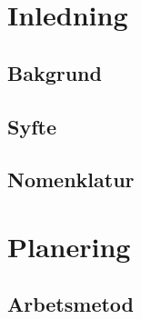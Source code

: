 %


\section{Inledning}\label{inledning}


\subsection{Bakgrund}


\subsection{Syfte}

\subsection{Nomenklatur}


\section{Planering}


\subsection{Arbetsmetod}

